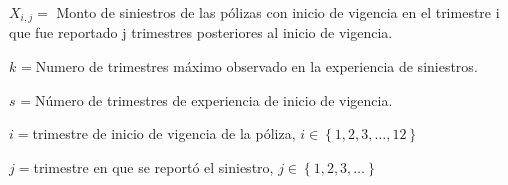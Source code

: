 \documentclass[11pt,twoside,openright,spanish]{report}
\numberwithin{equation}{chapter}
\numberwithin{figure}{chapter}
\numberwithin{table}{chapter}
\begin{document}
	${X}_{i,j}=$ Monto de siniestros de las pólizas con inicio de vigencia en el trimestre i que fue reportado j trimestres posteriores al inicio de vigencia.
	\noindent
	
	${k}_{}=$Numero de trimestres máximo observado en la experiencia de siniestros.
	\noindent
	
	${s}_{}=$Número de trimestres de experiencia de inicio de vigencia.
	\noindent
	
	$i=$trimestre de inicio de vigencia de la póliza, $i\in \left\{1,2,3,\dots ,12\right\}$
	\noindent
	
	$j=$trimestre en que se reportó el siniestro,  $j\in \left\{1,2,3,\dots\right\}$
	\noindent
	
	\doublespacing

$ $

\doublespacing
	
\end{document}
